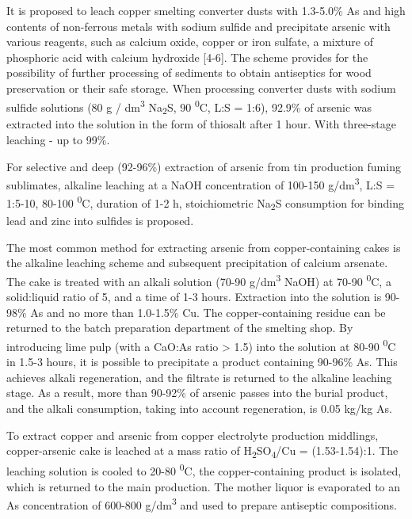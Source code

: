 \begin{multicols}{2}
It is proposed to leach copper smelting converter dusts with 1.3-5.0\%
As and high contents of non-ferrous metals with sodium sulfide and
precipitate arsenic with various reagents, such as calcium oxide, copper
or iron sulfate, a mixture of phosphoric acid with calcium hydroxide
{[}4-6{]}. The scheme provides for the possibility of further processing
of sediments to obtain antiseptics for wood preservation or their safe
storage. When processing converter dusts with sodium sulfide solutions
(80 g / dm\textsuperscript{3} Na\textsubscript{2}S, 90
\textsuperscript{0}C, L:S = 1:6), 92.9\% of arsenic was extracted into
the solution in the form of thiosalt after 1 hour. With three-stage
leaching - up to 99\%.

For selective and deep (92-96\%) extraction of arsenic from tin
production fuming sublimates, alkaline leaching at a NaOH concentration
of 100-150 g/dm\textsuperscript{3}, L:S = 1:5-10, 80-100
\textsuperscript{0}C, duration of 1-2 h, stoichiometric
Na\textsubscript{2}S consumption for binding lead and zinc into sulfides
is proposed.

The most common method for extracting arsenic from copper-containing
cakes is the alkaline leaching scheme and subsequent precipitation of
calcium arsenate. The cake is treated with an alkali solution (70-90
g/dm\textsuperscript{3} NaOH) at 70-90 \textsuperscript{0}C, a
solid:liquid ratio of 5, and a time of 1-3 hours. Extraction into the
solution is 90-98\% As and no more than 1.0-1.5\% Cu. The
copper-containing residue can be returned to the batch preparation
department of the smelting shop. By introducing lime pulp (with a CaO:As
ratio \textgreater{} 1.5) into the solution at 80-90
\textsuperscript{0}C in 1.5-3 hours, it is possible to precipitate a
product containing 90-96\% As. This achieves alkali regeneration, and
the filtrate is returned to the alkaline leaching stage. As a result,
more than 90-92\% of arsenic passes into the burial product, and the
alkali consumption, taking into account regeneration, is 0.05 kg/kg As.

To extract copper and arsenic from copper electrolyte production
middlings, copper-arsenic cake is leached at a mass ratio of
H\textsubscript{2}SO\textsubscript{4}/Cu = (1.53-1.54):1. The leaching
solution is cooled to 20-80 \textsuperscript{0}C, the copper-containing
product is isolated, which is returned to the main production. The
mother liquor is evaporated to an As concentration of 600-800
g/dm\textsuperscript{3} and used to prepare antiseptic compositions.


\end{multicols}
